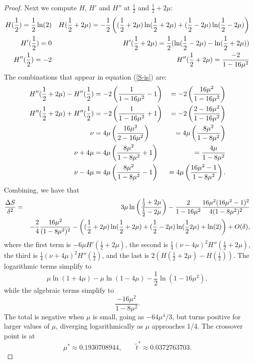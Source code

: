 \documentclass[12pt]{amsart}
\newcommand{\1}{\mathbf{1}}
\begin{document}
\begin{proof}
Next we compute $H$, $H'$ and $H''$ at $\frac12$ and $\frac12 + 2\mu$: 
\begin{eqnarray} 
H(\frac12) = \frac12 \ln(2) && H(\frac12 + 2\mu) = -\frac12 \left ( 
(\frac12 + 2\mu) \ln(\frac12 + 2\mu) + (\frac12 - 2\mu) \ln (\frac12 - 2\mu) \right )\cr 
H'(\frac12) = 0 && H'(\frac12 + 2\mu) = \frac12 (\ln(\frac12 - 2\mu) - \ln(\frac12 + 2\mu)) \cr 
H''(\frac12) = -2 && H''(\frac12 + 2\mu) = \frac{-2}{1-16\mu^2} 
\end{eqnarray}
The combinations that appear in equation (\ref{S-is}) are: 
\begin{eqnarray}
H''(\frac12 + 2\mu) - H''(\frac12) & = \displaystyle{-2 \left ( \frac{1}{1-16\mu^2} - 1 \right )} & = 
-2 \left (\frac{16\mu^2}{1-16\mu^2} \right ) \cr 
H''(\frac12 + 2\mu) + H''(\frac12) & = \displaystyle{-2 \left ( \frac{1}{1-16\mu^2} + 1 \right )} & = 
-2 \left (\frac{2-16\mu^2}{1-16\mu^2} \right ) \cr
\nu & = \displaystyle{4\mu \left( \frac{16\mu^2}{2-16\mu^2} \right )} & = 4 \mu \left (\frac{8\mu^2}{1-8\mu^2}
\right ) \cr 
\nu + 4\mu & = \displaystyle{4\mu \left (\frac{8\mu^2}{1-8\mu^2} + 1 \right )} & = \frac{4\mu}{1-8\mu^2} \cr 
\nu - 4\mu & = \displaystyle{4\mu \left ( \frac{8\mu^2}{1-8\mu^2} - 1 \right )} & = 
4\mu \left ( \frac{16 \mu^2 - 1}{1-8\mu^2} \right ).
\end{eqnarray}
Combining, we have that 
\begin{eqnarray} 
\frac{\Delta S}{\delta^2} & = & 3 \mu \ln \left ( \frac{\frac12 + 2\mu}{\frac12 - 2\mu}
\right ) - \frac{2}{1-16\mu^2} \frac{16\mu^2(16\mu^2-1)^2}{4(1-8\mu^2)^2} \cr 
&& - \frac24 \frac{16\mu^2}{(1-8\mu^2)^2} - \left ( 
(\frac12 + 2\mu) \ln(\frac12 + 2\mu) + (\frac12 - 2\mu) \ln(\frac12  2\mu) + \ln(2) \right )
+ O(\delta), 
\end{eqnarray}
where the first term is $-6\mu H'(\frac12+2\mu)$, the second is $\frac14 (\nu-4\mu)^2 H''(\frac12+2\mu)$, the third is $\frac14 (\nu+4\mu)^2 H''(\frac12)$, and the last is 
$2(H(\frac12+2\mu) -H(\frac12))$. The logarithmic terms simplify to 
\[
\mu \ln(1+4\mu) - \mu \ln(1-4\mu) - \frac12 \ln(1-16\mu^2),
\]
while the algebraic terms simplify to 
\[ \frac{-16\mu^2}{1-8\mu^2}. \]
The total is negative when $\mu$ is small, going as $-64 \mu^4/3$, but turns positive for
larger values of $\mu$, diverging logarithmically as $\mu$ approaches 1/4. 
The crossover point is at 
\begin{equation}\label{eqnCriticalPoint}
  \mu^* \approx 0.1930708944, \qquad \tilde t^* \approx 0.0372763703.
  \end{equation}
\end{proof}
\end{document}
